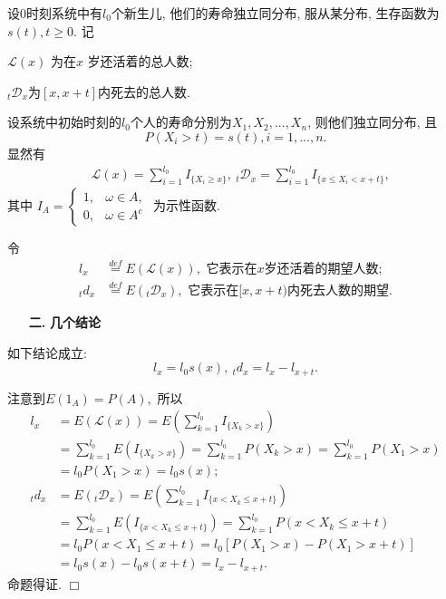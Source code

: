 \documentclass[a4paper,openany, 10pt]{ctexbook}
\newcommand{\hei}{\CJKfamily{hei}}      %
\def\qed{\hfill$\Box$\medskip}
\def\z{\left}
\def\y{\right}
\begin{document}
设0时刻系统中有$l_0$个新生儿, 他们的寿命独立同分布, 服从某分布, 生存函数为$s(t),t\ge 0.$  记

$\mathscr{L}(x)$ 为在$x$ 岁还活着的总人数;

$_t \mathscr{D}_x$为$[x,x+t]$内死去的总人数.

设系统中初始时刻的$l_0$个人的寿命分别为$X_1,X_2,...,X_n$, 则他们独立同分布, 且
$$P(X_i>t)=s(t), i=1,...,n.$$
显然有
\begin{align*}
     & \mathscr{L}(x)=\sum_{i=1}^{l_0}I_{\{X_{i}\geqslant x\}},\ {}_t\mathscr{D}_x=\sum_{i=1}^{l_0}I_{\{ x\leqslant X_i<x+t\}},
\end{align*}
其中
$
    I_{A}=\left\{\begin{array}{ll}1,&\omega\in A,\\0,&\omega\in A^c\end{array}\right.
$ 为示性函数.

令 \begin{align*}
    l_x     & \overset{def}{=}E(\mathscr L(x)), \text{ 它表示在}x\text{岁还活着的期望人数};         \\
    {}_td_x & \overset{def}{=}E({}_t\mathscr D_x ),\text{ 它表示在}[x,x+t)\text{内死去人数的期望}.
\end{align*}



\begin{itemize}
    \item[{\bf\hei 二.}]{\bf\hei 几个结论}
\end{itemize}

\begin{proposition} 如下结论成立:
    $$l_x=l_0s(x),\ {}_td_x=l_x-l_{x+t}.$$
\end{proposition}
\proof 注意到$E(1_A)=P(A),$ 所以
\begin{align*}
    l_x     & =E(\mathscr{L}(x))=E\z(\sum_{k=1}^{l_0}I_{\{X_k>x\}}\y)                        \\
            & =\sum_{k=1}^{l_0}E(I_{\{X_k>x\}})
    =\sum_{k=1}^{l_0}P(X_k>x)
    =\sum_{k=1}^{l_0}P(X_1>x)                                                            \\
            & =l_0P(X_1>x)=l_0s(x);                                                      \\
    {}_td_x & =E(_t\mathscr{D}_x)=E\z(\sum_{k=1}^{l_0}I_{\{x<X_k\leq x+t\}}\y)               \\
            & =\sum_{k=1}^{l_0}E(I_{\{x<X_k\leq x+t\}})=\sum_{k=1}^{l_0}P(x<X_k\leq x+t) \\
            & =l_0P(x<X_1\leq x+t)=l_0[P(X_1>x)-P(X_1>x+t)]                              \\
            & =l_0s(x)-l_0s(x+t)
    =l_x-l_{x+t}.
\end{align*}
命题得证. \qed
\end{document}
